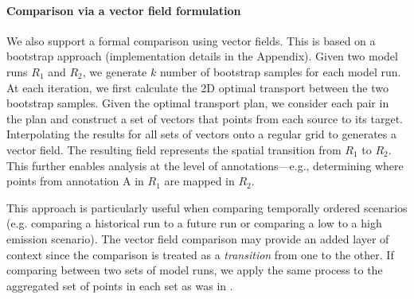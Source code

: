 \paragraph{Comparison via a vector field formulation}
We also support a formal comparison using vector fields. This is based on a bootstrap approach \cite{efron1992bootstrap} (implementation details in the Appendix).
%
Given two model runs $R_1$ and $R_2$, we generate $k$ number of bootstrap samples for each model run.
%
At each iteration, we first calculate the 2D optimal transport\cite{flamary2021pot} between the two bootstrap samples.
%
Given the optimal transport plan, we consider each pair in the plan and construct a set of vectors that points from each source to its target.
%
Interpolating the results for all sets of vectors onto a regular grid to generates a vector field.
%
%
%
The resulting field represents the spatial transition from $R_1$ to $R_2$. 
%
This further enables analysis at the level of annotations---e.g., determining where points from annotation A in $R_1$ are mapped in $R_2$.

This approach is particularly useful when comparing temporally ordered scenarios (e.g. comparing a historical run to a future run or comparing a low to a high emission scenario). The vector field comparison may provide an added layer of context since the comparison is treated as a \textit{transition} from one to the other.
%
If comparing between two sets of model runs, we apply the same process to the aggregated set of points in each set as was in .



